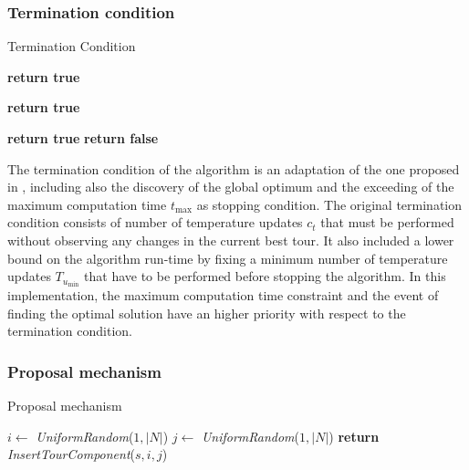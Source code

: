 \begin{homeworkProblem}

\subsubsection{Termination condition}
\begin{algorithm}[!h]
  \caption{Termination Condition}\label{SA:Term}
  \begin{algorithmic}[1]
				      \State \textbf{return true}
			 \EndIf
			  
				      \State \textbf{return true}
			  \EndIf
       
				      \State \textbf{return true}
			      \EndIf
			\Else    
        \State \textbf{return false}
      \EndIf
    \EndProcedure
\end{algorithmic}
\end{algorithm}

The termination condition of the algorithm is an adaptation of the one proposed in \cite{ohlmann2007compressed}, including also the discovery of the global optimum and the exceeding of the maximum computation time $t_{\max}$ as stopping condition.
The original termination condition consists of number of temperature updates $c_t$ that must be performed without observing any changes in the current best tour.
It also included a lower bound on the algorithm run-time by fixing a minimum number of temperature updates $T_{u_{\min}}$ that have to be performed before stopping the algorithm.
In this implementation, the maximum computation time constraint and the event of finding the optimal solution have an higher priority with respect to the termination condition.

\subsubsection{Proposal mechanism}
\begin{algorithm}
\caption{Proposal mechanism}
\label{SA:Prop}
\begin{algorithmic}
  \State $i \gets $ \emph{UniformRandom}($1,|N|$)
    \State $j \gets $ \emph{UniformRandom}($1,|N|$)
  \EndWhile  
  \State \textbf{return} \emph{InsertTourComponent}($s,i,j$)   
\EndProcedure
\end{algorithmic}
\end{algorithm}


\end{homeworkProblem}
